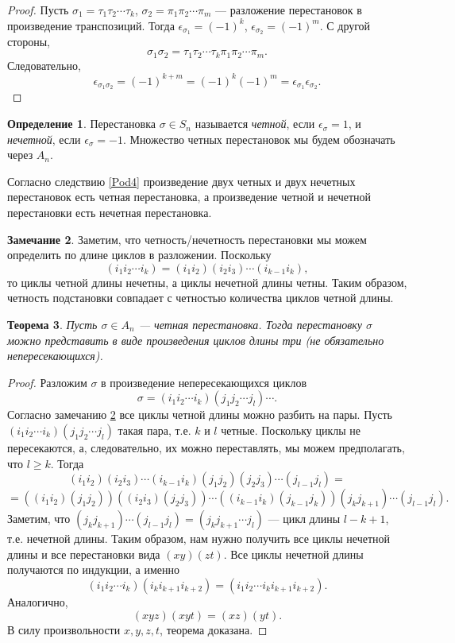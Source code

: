 \documentclass[12pt, titlepage, oneside]{amsbook}
\newtheorem{theorem}{Теорема}[chapter]
\theoremstyle{definition}
\newtheorem{definition}[theorem]{Определение}
\newtheorem{remark}[theorem]{Замечание}
\theoremstyle{remark}
\begin{document}
\begin{proof}
	Пусть $\sigma_1=\tau_1\tau_2\cdots\tau_k$, $\sigma_2=\pi_1\pi_2\cdots\pi_m$ --- разложение перестановок в произведение транспозиций. Тогда $\epsilon_{\sigma_1}=(-1)^k$, $\epsilon_{\sigma_2}=(-1)^m$. С другой стороны, $$\sigma_1 \sigma_2=\tau_1\tau_2\cdots\tau_k\pi_1\pi_2\cdots\pi_m.$$  Следовательно, $$\epsilon_{\sigma_1 \sigma_2}=(-1)^{k+m}=(-1)^k(-1)^m=\epsilon_{\sigma_1}\epsilon_{\sigma_2}.$$
\end{proof}

\begin{definition}
	Перестановка $\sigma\in S_n$ называется \emph{четной}, если $\epsilon_{\sigma}=1$, и \emph{нечетной}, если $\epsilon_{\sigma}=-1$. Множество четных перестановок мы будем обозначать через $A_n$.
\end{definition}

Согласно следствию \ref{Pod4} произведение двух четных и двух нечетных перестановок есть четная перестановка, а произведение четной и нечетной перестановки есть нечетная перестановка.

\begin{remark}
	\label{Pod41}
	Заметим, что четность/нечетность перестановки мы можем определить по длине циклов в разложении. Поскольку $$(i_1i_2\cdots i_k)=(i_1i_2)(i_2i_3)\cdots (i_{k-1}i_k),$$ то циклы четной длины нечетны, а циклы нечетной длины четны. Таким образом, четность подстановки совпадает с четностью количества циклов четной длины.
\end{remark}

\begin{theorem}
	\label{Pod5}
	Пусть $\sigma\in A_n$ --- четная перестановка. Тогда перестановку $\sigma$ можно представить в виде произведения циклов длины три (не обязательно непересекающихся).
\end{theorem}

\begin{proof}
	Разложим $\sigma$ в произведение непересекающихся циклов $$\sigma=(i_1i_2\cdots i_k)(j_1j_2\cdots j_l)\cdots.$$ Согласно замечанию \ref{Pod41} все циклы четной длины можно разбить на пары. Пусть $(i_1i_2\cdots i_k)(j_1j_2\cdots j_l)$ такая пара, т.е. $k$ и $l$ четные. Поскольку циклы не пересекаются, а, следовательно, их можно переставлять, мы можем предполагать, что $l\geq k$. Тогда $$(i_1i_2)(i_2i_3)\cdots (i_{k-1}i_k)(j_1j_2)(j_2j_3)\cdots (j_{l-1}j_l)=$$ $$=((i_1i_2)(j_1j_2))((i_2i_3)(j_2j_3))\cdots((i_{k-1}i_k)(j_{k-1}j_k))(j_k j_{k+1})\cdots(j_{l-1}j_l).$$ Заметим, что $(j_k j_{k+1})\cdots(j_{l-1}j_l)=(j_kj_{k+1}\cdots j_l)$ --- цикл длины $l-k+1$, т.е. нечетной длины. Таким образом, нам нужно получить все циклы нечетной длины и все перестановки вида $(xy)(zt)$. Все циклы нечетной длины получаются по индукции, а именно $$(i_1i_2\cdots i_k)(i_k i_{k+1} i_{k+2})=(i_1i_2\cdots i_k i_{k+1} i_{k+2}).$$ Аналогично, $$(xyz)(xyt)=(xz)(yt).$$ В силу произвольности $x,y,z,t$, теорема доказана.
\end{proof}
\end{document}
